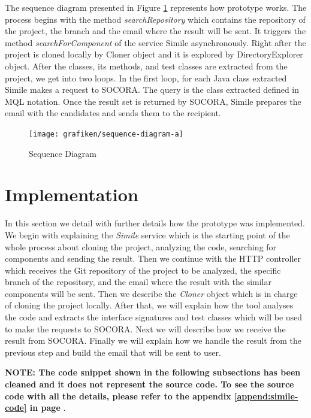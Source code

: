 The sequence diagram presented in Figure \ref{fig:sequence-diagram-a} represents how prototype works. The process begins with the method \emph{searchRepository} which contains the repository of the project, the branch and the email where the result will be sent. It triggers the method \emph{searchForComponent} of the service Simile asynchronously. Right after the project is cloned locally by Cloner object and it is explored by DirectoryExplorer object. After the classes, its methods, and test classes are extracted from the project, we get into two loops. In the first loop, for each Java class extracted Simile makes a request to SOCORA. The query is the class extracted defined in MQL notation. Once the result set is returned by SOCORA, Simile prepares the email with the candidates and sends them to the recipient.

\begin{figure}[H]
	\centering
    \texttt{[image: grafiken/sequence-diagram-a]}
    \caption{Sequence Diagram}
    \label{fig:sequence-diagram-a}
\end{figure}

\section{Implementation}
In this section we detail with further details how the prototype was implemented. We begin with explaining the \emph{Simile} service which is the starting point of the whole process about cloning the project, analyzing the code, searching for components and sending the result. Then we continue with the  HTTP controller which receives the Git repository of the project to be analyzed, the specific branch of the repository, and the email where the result with the similar components will be sent. Then we describe the \emph{Cloner} object which is in charge of cloning the project locally. After that, we will explain how the tool analyses the code and extracts the interface signatures and test classes which will be used to make the requests to SOCORA. Next we will describe how we receive the result from SOCORA. Finally we will explain how we handle the result from the previous step and build the email that will be sent to user.

\textbf{NOTE: The code snippet shown in the following subsections has been cleaned and it does not represent the source code. To see the source code with all the details, please refer to the appendix \ref{append:simile-code} in page \pageref{append:simile-code}}.

